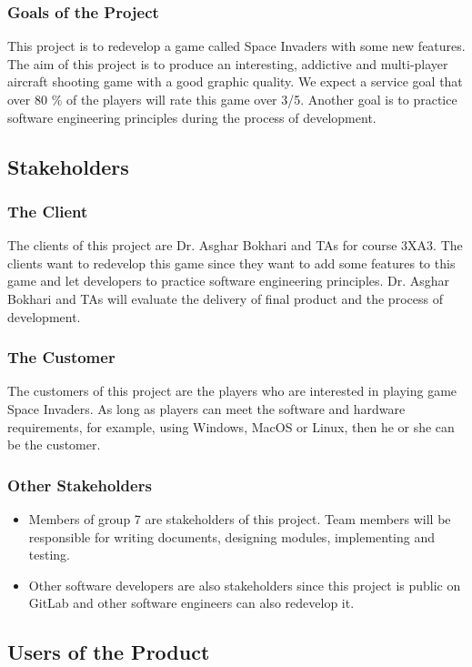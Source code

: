 \documentclass[12pt]{article}
\begin{document}
\subsubsection{Goals of the Project}
This project is to redevelop a game called Space Invaders with
some new features. The aim of this project is to produce an
interesting, addictive and multi-player aircraft shooting game
with a good graphic quality. We expect a service goal that over 80
\% of the players will rate this game over 3/5. Another goal is
to practice software engineering principles during the 
process of development.
\subsection{Stakeholders}
\subsubsection{The Client}
The clients of this project are Dr. Asghar Bokhari and TAs for
course 3XA3. The clients want to redevelop this game since
they 
want to add some features to this game and let developers to
practice software engineering principles. Dr. Asghar Bokhari and TAs will evaluate the delivery of final product and the
process of development.
\subsubsection{The Customer}
The customers of this project are the players who are interested in playing game Space Invaders. As long as 
players can meet the software and hardware requirements, for
example, using Windows, MacOS or Linux, then he or she can be the
customer.
\subsubsection{Other Stakeholders}
\begin{itemize}
\item Members of group 7 are stakeholders of this project. 
Team members will be responsible for writing documents, 
designing modules, implementing and testing.
\item Other software developers are also stakeholders since
this project is public on GitLab and other software
engineers can also redevelop it.
\end{itemize}
\subsection{Users of the Product}
\end{document}
